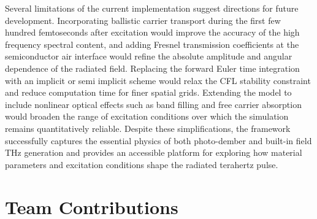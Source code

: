 \documentclass[12pt]{final_project_report}
\begin{document}
Several limitations of the current implementation suggest directions for future development. Incorporating ballistic carrier transport during the first few hundred femtoseconds after excitation would improve the accuracy of the high frequency spectral content, and adding Fresnel transmission coefficients at the semiconductor air interface would refine the absolute amplitude and angular dependence of the radiated field. Replacing the forward Euler time integration with an implicit or semi implicit scheme would relax the CFL stability constraint and reduce computation time for finer spatial grids. Extending the model to include nonlinear optical effects such as band filling and free carrier absorption would broaden the range of excitation conditions over which the simulation remains quantitatively reliable. Despite these simplifications, the framework successfully captures the essential physics of both photo-dember and built-in field THz generation and provides an accessible platform for exploring how material parameters and excitation conditions shape the radiated terahertz pulse.

\section{Team Contributions}
%

\newpage

\end{document}
